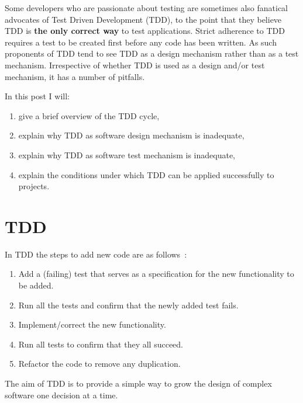 \documentclass{amsart}
\title{}
\author{}
\date{}
\begin{document}
  \maketitle
  
  Some developers who are passionate about testing are sometimes also fanatical advocates of Test Driven Development (TDD), to the point that they believe TDD is \textbf{the only correct way} to test applications. Strict adherence to TDD requires a test to be created first before any code has been written. As such proponents of TDD tend to see TDD as a design mechanism rather than as a test mechanism. Irrespective of whether TDD is used as a design and/or test mechanism, it has a number of pitfalls.
  
  In this post I will:
  \begin{enumerate}
   \item give a brief overview of the TDD cycle,
   \item explain why TDD as software design mechanism is inadequate,
   \item explain why TDD as software test mechanism is inadequate,
   \item explain the conditions under which TDD can be applied successfully to projects.
  \end{enumerate}

  
  \section{TDD}
  In TDD the steps to add new code are as follows~\cite{Beck2003}:
  \begin{enumerate}
   \item Add a (failing) test that serves as a specification for the new functionality to be added.
   \item Run all the tests and confirm that the newly added test fails.
   \item Implement/correct the new functionality.
   \item Run all tests to confirm that they all succeed.
   \item Refactor the code to remove any duplication.
  \end{enumerate}
  
  The aim of TDD is to provide a simple way to grow the design of complex software one decision at a time. 

  
\end{document}
